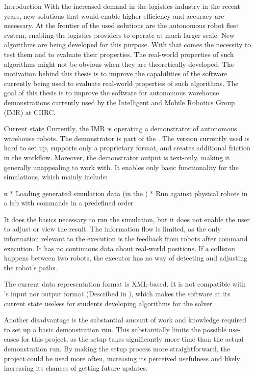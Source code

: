 \chap Introduction
With the increased demand in the logistics industry in the recent years, new solutions that would enable higher efficiency and accuracy are necessary. At the frontier of the used solutions are the autonomous robot fleet system, enabling the logistics providers to operate at much larger scale. New algorithms are being developed for this purpose. With that comes the necessity to test them and to evaluate their properties. The real-world properties of such algorithms might not be obvious when they are theoretically developed.
The motivation behind this thesis is to improve the capabilities of the software currently being used to evaluate real-world properties of such algorithms.
\br
\br
The goal of this thesis is to improve the software for autonomous warehouse demonstrations currently used by the Intelligent and Mobile Robotics Group (IMR) at CIIRC. 

\sec Current state
Currently, the IMR is operating a demonstrator of autonomous warehouse robots. The demonstrator is part of the {\oldRepo}. The version currently used is hard to set up, supports only a proprietary format, and creates additional friction in the workflow. Moreover, the demonstrator output is text-only, making it generally unappealing to work with. It enables only basic functionality for the simulations, which mainly include:

\begitems \style n
    * Loading generated simulation data (in the {\oldFormat})
    * Run against physical robots in a lab with commands in a predefined order
\enditems

It does the basics necessary to run the simulation, but it does not enable the user to adjust or view the result. The information flow is limited, as the only information relevant to the execution is the feedback from robots after command execution. It has no continuous data about real-world positions. If a collision happens between two robots, the executor has no way of detecting and adjusting the robot's paths.

The current data representation format is XML-based. It is not compatible with {\mapfIR}'s input nor output format (Described in {}), which makes the software at its current state useless for students developing algorithms for the {\mapfIR} solver. 

Another disadvantage is the substantial amount of work and knowledge required to set up a basic demonstration run. This substantially limits the possible use-cases for this project, as the setup takes significantly more time than the actual demonstration run. By making the setup process more straightforward, the project could be used more often, increasing its perceived usefulness and likely increasing its chances of getting future updates.

